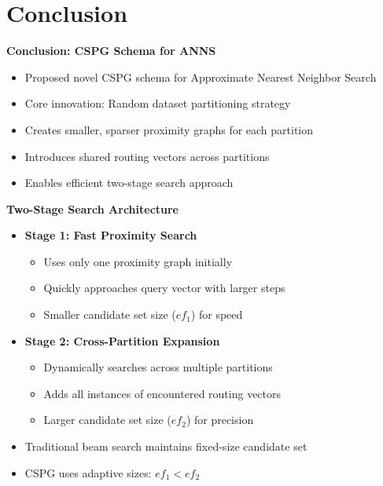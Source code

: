 \section{Conclusion}%
\begin{frame}
\begin{center}
\LARGE\textbf{Conclusion: CSPG Schema for ANNS}
\end{center}

\vspace{10pt}

\begin{itemize}
    \item Proposed novel CSPG schema for Approximate Nearest Neighbor Search
    \item Core innovation: Random dataset partitioning strategy
    \item Creates smaller, sparser proximity graphs for each partition
    \item Introduces shared routing vectors across partitions
    \item Enables efficient two-stage search approach
\end{itemize}
\end{frame}%
\begin{frame}
\begin{center}
\Large\textbf{Two-Stage Search Architecture}
\end{center}

\vspace{10pt}

\begin{itemize}
    \item \textbf{Stage 1: Fast Proximity Search}
    \begin{itemize}
        \item Uses only one proximity graph initially
        \item Quickly approaches query vector with larger steps
        \item Smaller candidate set size ($ef_1$) for speed
    \end{itemize}
    
    \item \textbf{Stage 2: Cross-Partition Expansion}
    \begin{itemize}
        \item Dynamically searches across multiple partitions
        \item Adds all instances of encountered routing vectors
        \item Larger candidate set size ($ef_2$) for precision
    \end{itemize}
    
    \item Traditional beam search maintains fixed-size candidate set
    \item CSPG uses adaptive sizes: $ef_1 < ef_2$
\end{itemize}
\end{frame}%
